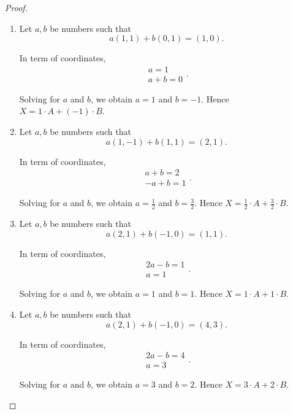 \begin{proof}
    \begin{enumerate}[label={(\alph*)},itemsep=0pt]
        \item Let $a, b$ be numbers such that
              \[
                  a(1, 1) + b(0, 1) = (1, 0).
              \]

              In term of coordinates,
              \[
                  \begin{split}
                      a = 1 \\
                      a + b = 0
                  \end{split}.
              \]

              Solving for $a$ and $b$, we obtain $a = 1$ and $b = -1$. Hence $X = 1\cdot A + (-1)\cdot B$.
        \item Let $a, b$ be numbers such that
              \[
                  a(1, -1) + b(1, 1) = (2, 1).
              \]

              In term of coordinates,
              \[
                  \begin{split}
                      a + b = 2 \\
                      -a + b = 1
                  \end{split}.
              \]

              Solving for $a$ and $b$, we obtain $a = \frac{1}{2}$ and $b = \frac{3}{2}$. Hence $X = \frac{1}{2}\cdot A + \frac{3}{2}\cdot B$.
        \item Let $a, b$ be numbers such that
              \[
                  a(2, 1) + b(-1, 0) = (1, 1).
              \]

              In term of coordinates,
              \[
                  \begin{split}
                      2a - b = 1 \\
                      a = 1
                  \end{split}.
              \]

              Solving for $a$ and $b$, we obtain $a = 1$ and $b = 1$. Hence $X = 1\cdot A + 1\cdot B$.
        \item Let $a, b$ be numbers such that
              \[
                  a(2, 1) + b(-1, 0) = (4, 3).
              \]

              In term of coordinates,
              \[
                  \begin{split}
                      2a - b = 4 \\
                      a = 3
                  \end{split}.
              \]

              Solving for $a$ and $b$, we obtain $a = 3$ and $b = 2$. Hence $X = 3\cdot A + 2\cdot B$.
    \end{enumerate}
\end{proof}

